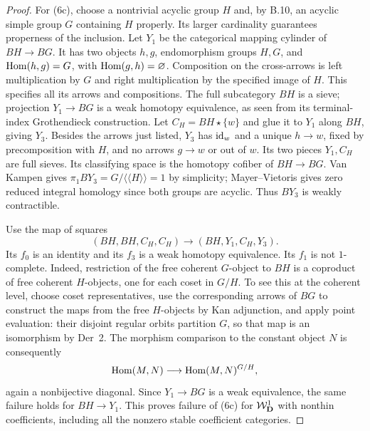 \begin{proof}
For (6c), choose a nontrivial acyclic group $H$ and,
by B.10, an acyclic simple group $G$ containing $H$
properly. Its larger cardinality guarantees properness
of the inclusion. Let $Y_1$ be the categorical mapping
cylinder of $BH\to BG$. It has two objects $h,g$,
endomorphism groups $H,G$, and
$\operatorname{Hom}(h,g)=G$, with $\operatorname{Hom}(g,h)=\varnothing$.
Composition on the cross-arrows is left multiplication
by $G$ and right multiplication by the specified image
of $H$. This specifies all its arrows and compositions.
The full subcategory $BH$ is a sieve; projection
$Y_1\to BG$ is a weak homotopy equivalence, as seen
from its terminal-index Grothendieck construction.
Let $C_H=BH\star\{w\}$ and glue it to $Y_1$ along
$BH$, giving $Y_3$. Besides the arrows just listed,
$Y_3$ has $\mathrm{id}_w$ and a unique $h\to w$, fixed by
precomposition with $H$, and no arrows $g\to w$ or
out of $w$. Its two pieces $Y_1,C_H$ are full sieves.
Its classifying space is the homotopy cofiber of
$BH\to BG$. Van Kampen gives
$\pi_1BY_3=G/\langle\!\langle H\rangle\!\rangle=1$
by simplicity; Mayer--Vietoris gives zero reduced
integral homology since both groups are acyclic.
Thus $BY_3$ is weakly contractible.

Use the map of squares
\[
 (BH,BH,C_H,C_H)\longrightarrow(BH,Y_1,C_H,Y_3).
\tag{B.6.5}
\]
Its $f_0$ is an identity and its $f_3$ is a weak
homotopy equivalence. Its $f_1$ is not $1$-complete.
Indeed, restriction of the free coherent $G$-object
to $BH$ is a coproduct of free coherent $H$-objects,
one for each coset in $G/H$. To see this at the
coherent level, choose coset representatives, use
the corresponding arrows of $BG$ to construct the
maps from the free $H$-objects by Kan adjunction,
and apply point evaluation: their disjoint regular
orbits partition $G$, so that map is an isomorphism
by Der~2. The morphism comparison to the constant
object $N$ is consequently
\[
 \operatorname{Hom}(M,N)\longrightarrow\operatorname{Hom}(M,N)^{G/H},
\]
again a nonbijective diagonal. Since $Y_1\to BG$
is a weak equivalence, the same failure holds for
$BH\to Y_1$. This proves failure of (6c) for
$\mathcal W_{\mathbf D}^{1}$ with nonthin coefficients, including all
the nonzero stable coefficient categories.


\end{proof}
